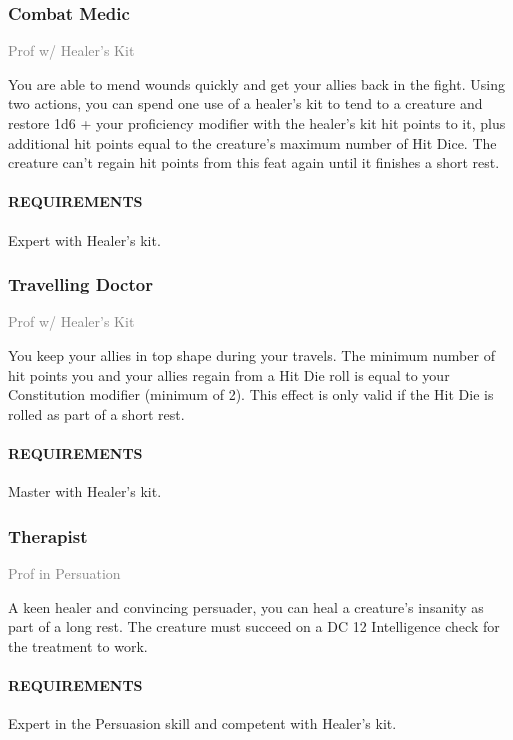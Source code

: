     \subsubsection{Combat Medic} \label{feat::combatmedic}
    \small{\textcolor{gray}{Prof w/ Healer's Kit}}

    \normalsize
    You are able to mend wounds quickly and get your allies back in the fight.
    Using two actions, you can spend one use of a healer's kit to tend to a creature and restore 1d6 + your proficiency modifier with the healer's kit hit points to it, plus additional hit points equal to the creature's maximum number of Hit Dice.
    The creature can't regain hit points from this feat again until it finishes a short rest.
    \paragraph{REQUIREMENTS} Expert with Healer's kit.

    \subsubsection{Travelling Doctor} \label{feat::travellingdoctor}
    \small{\textcolor{gray}{Prof w/ Healer's Kit}}

    \normalsize
    You keep your allies in top shape during your travels.
    The minimum number of hit points you and your allies regain from a Hit Die roll is equal to your Constitution modifier (minimum of 2).
    This effect is only valid if the Hit Die is rolled as part of a short rest.
    \paragraph{REQUIREMENTS} Master with Healer's kit.

    \subsubsection{Therapist} \label{feat::therapist}
    \small{\textcolor{gray}{Prof in Persuation}}

    \normalsize
    A keen healer and convincing persuader, you can heal a creature's insanity as part of a long rest.
    The creature must succeed on a DC 12 Intelligence check for the treatment to work.
    \paragraph{REQUIREMENTS} Expert in the Persuasion skill and competent with Healer's kit.

